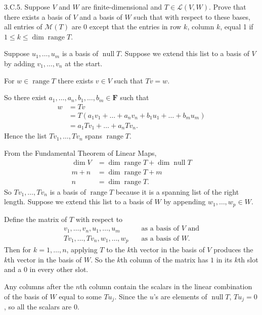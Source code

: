 \documentclass[a5paper]{article}
\begin{document}
\newcommand   \C           {\mathbf{C}}
\newcommand   \R           {\mathbf{R}}
\renewcommand \L           {\mathcal{L}}
\newcommand   \F           {\mathbf{F}}
\renewcommand \P           {\mathcal{P}}
\newcommand   \M           {\mathcal{M}}
\newcommand   \op          {\operatorname}

    3.C.5.
    Suppose $V$ and $W$ are finite-dimensional and $T \in \L(V,W)$.
    Prove that there exists a basis of $V$ and a basis of $W$ such that with respect to these bases, all entries of $\M(T)$ are 0 except that the entries in row $k$, column $k$, equal 1 if $1 \le k \le \op{dim}\op{range}T$.

    Suppose $u_1,\dots,u_m$ is a basis of $\op{null}T$.
    Suppose we extend this list to a basis of $V$ by adding $v_1,\dots,v_n$ at the start.

    For $w \in \op{range}T$ there exists $v \in V$ such that $Tv = w$.

    So there exist $a_1,\dots,a_n,b_1,\dots,b_m \in \F$ such that
\begin{align*}
        w &= Tv \\
          &= T(a_1v_1 + \dots + a_nv_n + b_1u_1 + \dots + b_mu_m) \\
          &= a_1Tv_1 + \dots + a_nTv_n .
\end{align*}
    Hence the list $Tv_1,\dots,Tv_n$ spans $\op{range}T$.

    From the Fundamental Theorem of Linear Maps,
\begin{align*}
        \op{dim}V &= \op{dim}\op{range}T + \op{dim}\op{null}T \\
            m + n &= \op{dim}\op{range}T + m \\
                n &= \op{dim}\op{range}T .
\end{align*}
    So $Tv_1,\dots,Tv_n$ is a basis of $\op{range}T$ because it is a spanning list of the right length.
    Suppose we extend this list to a basis of $W$ by appending $w_1,\dots,w_p \in W$.

    Define the matrix of $T$ with respect to
\begin{align*}
        v_1,\dots,v_n,u_1,\dots,u_m   &\quad\text{as a basis of $V$ and}\\
        Tv_1,\dots,Tv_n,w_1,\dots,w_p &\quad\text{as a basis of $W$.}
\end{align*}
    Then for $k=1,\dots,n$, applying $T$ to the $k$th vector in the basis of $V$ produces the $k$th vector in the basis of $W$.
    So the $k$th column of the matrix has $1$ in its $k$th slot and a $0$ in every other slot.

    Any columns after the $n$th column contain the scalars in the linear combination of the basis of $W$ equal to some $Tu_j$.
    Since the $u$'s are elements of $\op{null}T$, $Tu_j = 0$, so all the scalars are 0.
\end{document}
